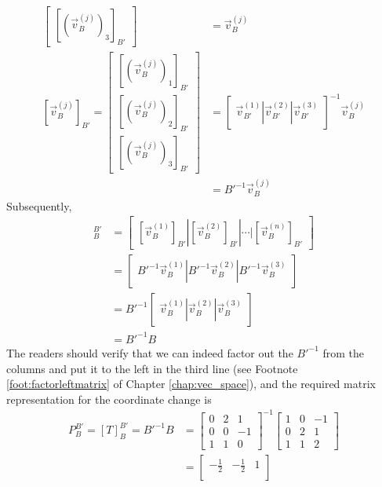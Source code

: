 \begin{solution}
\begin{align*}
\begin{bmatrix}
[(\vec{v}_{B}^{(j)})_3]_{B'}
\end{bmatrix}
&=
\vec{v}_{B}^{(j)} \\
[\vec{v}_{B}^{(j)}]_{B'} =
\begin{bmatrix}
[(\vec{v}_{B}^{(j)})_1]_{B'} \\
[(\vec{v}_{B}^{(j)})_2]_{B'} \\
[(\vec{v}_{B}^{(j)})_3]_{B'}
\end{bmatrix}
&=
\begin{bmatrix}
\vec{v}_{B'}^{(1)} | \vec{v}_{B'}^{(2)} | \vec{v}_{B'}^{(3)}
\end{bmatrix}^{-1}
\vec{v}_{B}^{(j)} \\
&= B'^{-1}\vec{v}_{B}^{(j)}
\end{align*} 
Subsequently,
\begin{align*}
[T]_B^{B'} &= \begin{bmatrix}
[\vec{v}_{B}^{(1)}]_{B'} | [\vec{v}_{B}^{(2)}]_{B'} | \cdots | [\vec{v}_{B}^{(n)}]_{B'}
\end{bmatrix} \\
&= \begin{bmatrix}
B'^{-1}\vec{v}_{B}^{(1)} | B'^{-1}\vec{v}_{B}^{(2)} | B'^{-1}\vec{v}_{B}^{(3)}
\end{bmatrix} \\
&= B'^{-1}\begin{bmatrix}
\vec{v}_{B}^{(1)} | \vec{v}_{B}^{(2)} | \vec{v}_{B}^{(3)}
\end{bmatrix} \\
&= B'^{-1}B
\end{align*}
The readers should verify that we can indeed factor out the $B'^{-1}$ from the columns and put it to the left in the third line (see Footnote \ref{foot:factorleftmatrix} of Chapter \ref{chap:vec_space}), and the required matrix representation for the coordinate change is
\begin{align*}
P_B^{B'} = [T]_B^{B'} = B'^{-1}B &= 
\begin{bmatrix}
0 & 2 & 1 \\
0 & 0 & -1 \\
1 & 1 & 0
\end{bmatrix}^{-1}
\begin{bmatrix}
1 & 0 & -1\\
0 & 2 & 1 \\
1 & 1 & 2
\end{bmatrix} \\
&=
\begin{bmatrix}
-\frac{1}{2} & -\frac{1}{2} & 1 \\

\end{bmatrix}
\end{align*}
\end{solution}
